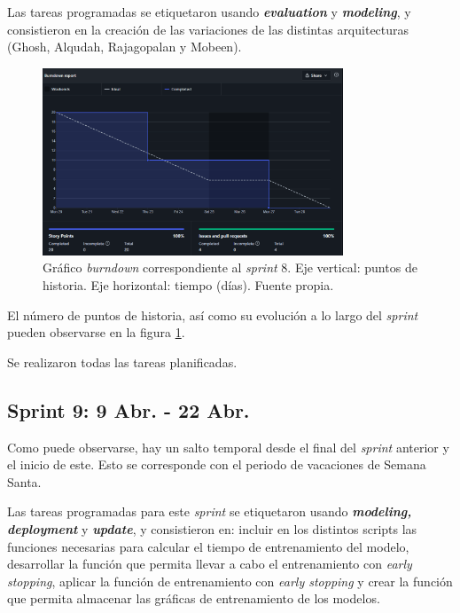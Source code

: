 Las tareas programadas se etiquetaron usando \textbf{\textit{evaluation}} y \textbf{\textit{modeling}}, y consistieron en la creación de las variaciones de las distintas arquitecturas (Ghosh, Alqudah, Rajagopalan y Mobeen). 

\begin{figure}[h]
    \centering
    \includegraphics[width=0.8\textwidth]{img/bd_20mar.png}
    \caption{Gráfico \textit{burndown} correspondiente al \textit{sprint} 8. Eje vertical: puntos de historia. Eje horizontal: tiempo (días). Fuente propia.}
    \label{fig:bd_8}
\end{figure}

El número de puntos de historia, así como su evolución a lo largo del \textit{sprint} pueden observarse en la figura \ref{fig:bd_8}.

Se realizaron todas las tareas planificadas.

\subsection{Sprint 9: 9 Abr. - 22 Abr.}

Como puede observarse, hay un salto temporal desde el final del \textit{sprint} anterior y el inicio de este. Esto se corresponde con el periodo de vacaciones de Semana Santa.

Las tareas programadas para este \textit{sprint} se etiquetaron usando \textbf{\textit{modeling, deployment}} y \textbf{\textit{update}}, y consistieron en: incluir en los distintos scripts las funciones necesarias para calcular el tiempo de entrenamiento del modelo, desarrollar la función que permita llevar a cabo el entrenamiento con \textit{early stopping}, aplicar la función de entrenamiento con \textit{early stopping} y crear la función que permita almacenar las gráficas de entrenamiento de los modelos. 

